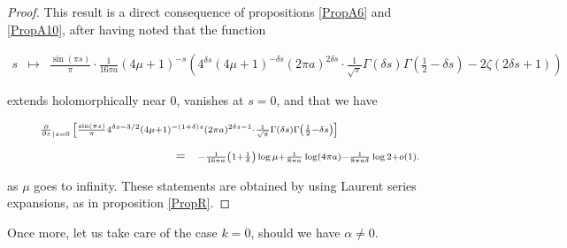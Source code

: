 \documentclass{jams-l}
\theoremstyle{definition}
\theoremstyle{remark}
\numberwithin{equation}{section}
\begin{document}
            \begin{proof}
            
                This result is a direct consequence of propositions \ref{PropA6} and \ref{PropA10}, after having noted that the function
                
                \[ \begin{array}{lll}
                        \scriptstyle s & \scriptstyle \longmapsto & \scriptstyle \frac{\sin \left( \pi s \right)}{\pi} \cdot \frac{1}{16 \pi a} \left( 4 \mu + 1 \right)^{-s} \left( 4^{\delta s} \left( 4 \mu + 1 \right)^{-\delta s} \left( 2 \pi a \right)^{2 \delta s} \cdot \frac{1}{\sqrt{\pi}} \Gamma \left( \delta s \right) \Gamma \left( \frac{1}{2} - \delta s \right) - 2 \zeta \left( 2 \delta s + 1 \right) \right)
                    \end{array} \]
                
                \noindent extends holomorphically near $0$, vanishes at $s=0$, and that we have
                
                \[ \begin{array}{lll}
                        \multicolumn{3}{l}{\scriptstyle \frac{\partial}{\partial s}_{\left \vert s = 0 \right.} \left[ \frac{\sin \left( \pi s \right)}{\pi} 4^{\delta s -3/2} \left( 4 \mu + 1 \right)^{- \left( 1+\delta \right) s} \left( 2 \pi a \right)^{2 \delta s-1} \cdot \frac{1}{\sqrt{\pi}} \Gamma \left( \delta s \right) \Gamma \left( \frac{1}{2} - \delta s \right) \right]} \\[1em]
                        
                        \qquad \qquad \qquad \qquad \qquad & = & \scriptstyle - \frac{1}{16 \pi a} \left( 1 + \frac{1}{\delta} \right) \log \mu + \frac{1}{8 \pi a} \log \left( 4 \pi a \right) - \frac{1}{8 \pi a \delta} \log 2 + o \left( 1 \right).
                    \end{array} \]
                
                \noindent as $\mu$ goes to infinity. These statements are obtained by using Laurent series expansions, as in proposition \ref{PropR}.
            
            \end{proof}
            
            Once more, let us take care of the case $k = 0$, should we have $\alpha \neq 0$.
            
\end{document}
